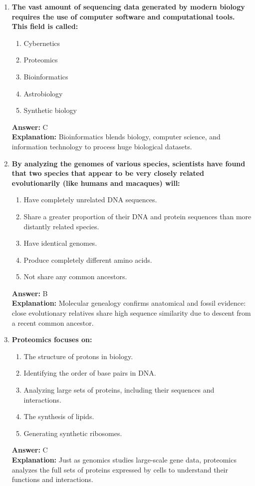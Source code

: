\documentclass[11pt, a4paper]{article}
\begin{document}
\begin{enumerate}
\item \textbf{The vast amount of sequencing data generated by modern biology requires the use of computer software and computational tools. This field is called:}
\begin{enumerate}[label=\Alph*.]
    \item Cybernetics
    \item Proteomics
    \item Bioinformatics
    \item Astrobiology
    \item Synthetic biology
\end{enumerate}
\textbf{Answer:} C \\
\textbf{Explanation:} Bioinformatics blends biology, computer science, and information technology to process huge biological datasets.

\item \textbf{By analyzing the genomes of various species, scientists have found that two species that appear to be very closely related evolutionarily (like humans and macaques) will:}
\begin{enumerate}[label=\Alph*.]
    \item Have completely unrelated DNA sequences.
    \item Share a greater proportion of their DNA and protein sequences than more distantly related species.
    \item Have identical genomes.
    \item Produce completely different amino acids.
    \item Not share any common ancestors.
\end{enumerate}
\textbf{Answer:} B \\
\textbf{Explanation:} Molecular genealogy confirms anatomical and fossil evidence: close evolutionary relatives share high sequence similarity due to descent from a recent common ancestor.

\item \textbf{Proteomics focuses on:}
\begin{enumerate}[label=\Alph*.]
    \item The structure of protons in biology.
    \item Identifying the order of base pairs in DNA.
    \item Analyzing large sets of proteins, including their sequences and interactions.
    \item The synthesis of lipids.
    \item Generating synthetic ribosomes.
\end{enumerate}
\textbf{Answer:} C \\
\textbf{Explanation:} Just as genomics studies large-scale gene data, proteomics analyzes the full sets of proteins expressed by cells to understand their functions and interactions.

\end{enumerate}
\end{document}
